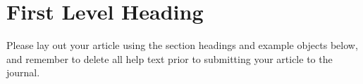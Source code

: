 \section{First Level Heading}
Please lay out your article using the section headings and example objects below, and remember to delete all help text prior to submitting your article to the journal.